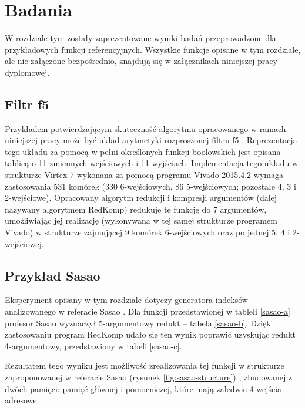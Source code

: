 \chapter{Badania}
\label{chapter:research}

W rozdziale tym zostały zaprezentowane wyniki badań przeprowadzone dla przykładowych funkcji referencyjnych.
Wszystkie funkcje opisane w tym rozdziale,
ale nie załączone bezpośrednio,
znajdują się w załącznikach niniejszej pracy dyplomowej.

\section{Filtr f5}

Przykładem potwierdzającym skuteczność algorytmu opracowanego w ramach niniejszej pracy
może być układ arytmetyki rozproszonej \cite{memory-capacity} filtru f5 \cite{nine-filters}.
Reprezentacja tego układu za pomocą w pełni określonych funkcji boolowskich
jest opisana tablicą o 11 zmiennych wejściowych i 11 wyjściach.
Implementacja tego układu \cite{redukcja-kompresja} w strukturze Virtex-7 wykonana za pomocą programu Vivado 2015.4.2
wymaga zastosowania 531 komórek (330 6-wejściowych, 86 5-wejściowych; pozostałe 4, 3 i 2-wejściowe).
Opracowany algorytm redukcji i kompresji argumentów (dalej nazywany algorytmem RedKomp)
redukuje tę funkcję do 7 argumentów,
umożliwiając jej realizację
(wykonywana w tej samej strukturze programem Vivado)
w strukturze zajmującej 9 komórek 6-wejściowych oraz po jednej 5, 4 i 2-wejściowej.

\section{Przykład Sasao}

Eksperyment opisany w tym rozdziale dotyczy generatora indeksów analizowanego w referacie Sasao \cite{sasao-workshop}.
Dla funkcji przedstawionej w tableli \ref{sasao-a} profesor Sasao wyznaczył 5-argumentowy redukt – tabela \ref{sasao-b}.
Dzięki zastosowaniu program RedKomp udało się ten wynik poprawić uzyskując redukt 4-argumentowy,
przedstawiony w tabeli \ref{sasao-c}.



Rezultatem tego wyniku jest możliwość zrealizowania tej funkcji w strukturze zaproponowanej w referacie Sasao (rysunek \ref{fig:sasao-structure}) \cite{sasao-workshop},
zbudowanej z dwóch pamięci: pamięć głównej i pomocniczej,
które mają zaledwie 4 wejścia adresowe.

